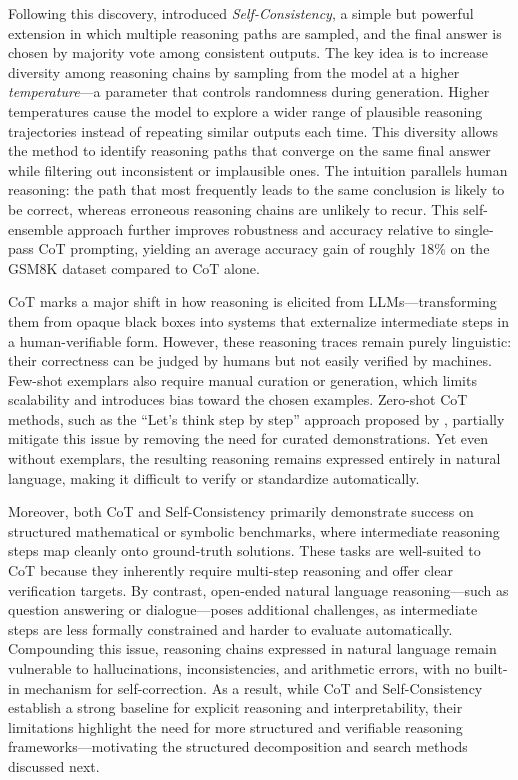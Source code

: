 \documentclass[project]{bsu-cs}  %
\begin{document}
Following this discovery, \citet{wang2023selfconsistencyimproveschainthought} introduced \textit{Self-Consistency}, a simple but powerful extension in which multiple reasoning paths are sampled, and the final answer is chosen by majority vote among consistent outputs. The key idea is to increase diversity among reasoning chains by sampling from the model at a higher \textit{temperature}—a parameter that controls randomness during generation. Higher temperatures cause the model to explore a wider range of plausible reasoning trajectories instead of repeating similar outputs each time. This diversity allows the method to identify reasoning paths that converge on the same final answer while filtering out inconsistent or implausible ones. The intuition parallels human reasoning: the path that most frequently leads to the same conclusion is likely to be correct, whereas erroneous reasoning chains are unlikely to recur. This self-ensemble approach further improves robustness and accuracy relative to single-pass CoT prompting, yielding an average accuracy gain of roughly 18\% on the GSM8K dataset compared to CoT alone.

CoT marks a major shift in how reasoning is elicited from LLMs—transforming them from opaque black boxes into systems that externalize intermediate steps in a human-verifiable form. However, these reasoning traces remain purely linguistic: their correctness can be judged by humans but not easily verified by machines. Few-shot exemplars also require manual curation or generation, which limits scalability and introduces bias toward the chosen examples. Zero-shot CoT methods, such as the “Let’s think step by step” approach proposed by \citet{kojima2023largelanguagemodelszeroshot}, partially mitigate this issue by removing the need for curated demonstrations. Yet even without exemplars, the resulting reasoning remains expressed entirely in natural language, making it difficult to verify or standardize automatically.

Moreover, both CoT and Self-Consistency primarily demonstrate success on structured mathematical or symbolic benchmarks, where intermediate reasoning steps map cleanly onto ground-truth solutions. These tasks are well-suited to CoT because they inherently require multi-step reasoning and offer clear verification targets. By contrast, open-ended natural language reasoning—such as question answering or dialogue—poses additional challenges, as intermediate steps are less formally constrained and harder to evaluate automatically. Compounding this issue, reasoning chains expressed in natural language remain vulnerable to hallucinations, inconsistencies, and arithmetic errors, with no built-in mechanism for self-correction. As a result, while CoT and Self-Consistency establish a strong baseline for explicit reasoning and interpretability, their limitations highlight the need for more structured and verifiable reasoning frameworks—motivating the structured decomposition and search methods discussed next.
% 
%
%
% 
\end{document}
